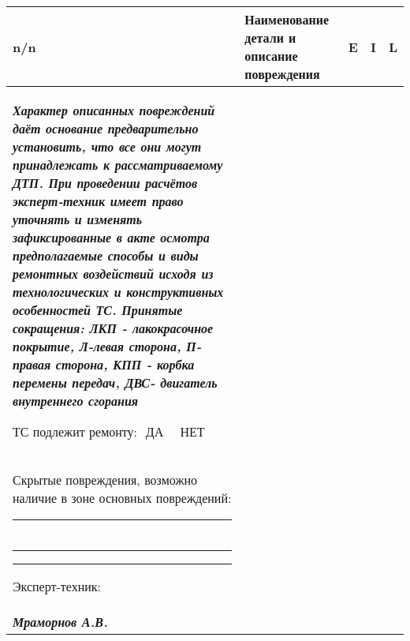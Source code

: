 \documentclass[a4paper,10pt]{report}
\begin{document}
\begin{longtable}{G{3mm}|M{130mm}|G{5mm}|G{5mm}|G{5mm}}
	\hline  \hline   \toprule 
	\bf  {\footnotesize  n/n}  &\bf {\small Наименование  детали и описание повреждения} & \bf {\small E} & \bf {\small I} & \bf {\small L}\\\hline \hline \toprule  \endhead 



\vspace{-3mm}
\begin{spacing}{.65}
\begin{tcolorbox}[title=\textsl{Примечание},leftrule=-0.4pt,rightrule=-0.4pt,toprule=0pt,titlerule=0pt,sharp corners,
	colback=white,colframe=black,coltitle=black,colbacktitle=YellowOrange]
{\footnotesize \textbf{\textit{{Характер описанных повреждений даёт основание предварительно установить, что все они могут принадлежать
				к рассматриваемому ДТП. При проведении расчётов эксперт-техник имеет право уточнять и изменять зафиксированные в акте осмотра предполагаемые способы и
				виды ремонтных воздействий исходя из технологических и конструктивных особенностей ТС. Принятые сокращения: ЛКП - лакокрасочное
				покрытие, Л-левая сторона, П- правая сторона, КПП - корбка перемены передач, ДВС- двигатель внутреннего сгорания}}}}
\end{tcolorbox}
\end{spacing}
\vspace{2mm}

\noindent ТС подлежит ремонту:\,\, ДА\, {\large {}}\,\,\, НЕТ {\large {}}\\
\noindent Скрытые повреждения, возможно наличие в зоне основных повреждений: \rule{50mm}{0.1mm}\\
\rule{170mm}{0.1mm}
\rule{170mm}{0.1mm}

\vspace{3mm}
\begin{tcolorbox}[title=\textsl{Подписи и замечания сторон},leftrule=0pt,rightrule=0pt,toprule=0pt,titlerule=0pt,sharp corners,
	colback=white,colframe=white,coltitle=black,colbacktitle=YellowOrange]
\end{tcolorbox}
\vspace{-5mm}
\centering
\raggedright Эксперт-техник: \\ \hspace{1.7cm}
\raggedright\textbf{\textsl{ Мраморнов А.В. }}
\vspace{-3mm}


\end{longtable}
\end{document}
